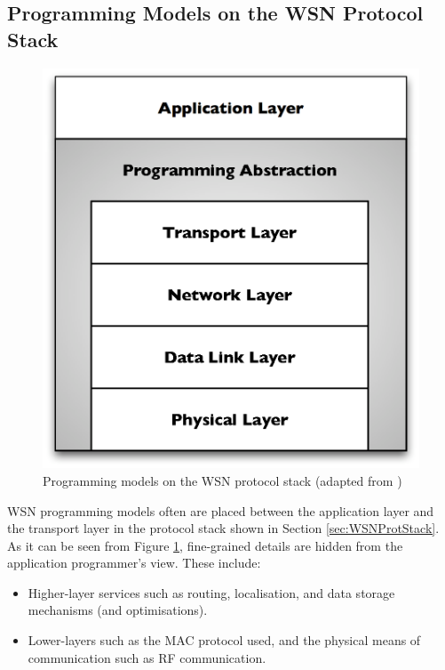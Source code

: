 \subsection{Programming Models on the WSN Protocol Stack}

\begin{figure}
\centering
\includegraphics[scale=0.61]{img/ProtStack_ProgAbstr.eps}
\caption[Programming models on the WSN protocol stack]{Programming models on the WSN protocol
stack (adapted from \cite{mottola_middleware:2008})}
\label{Fig:ProtStack_ProgAbstr}
\end{figure}

WSN programming models often are placed between the application layer and the
transport layer in the protocol stack shown in Section \ref{sec:WSNProtStack}. As it can be seen from
Figure \ref{Fig:ProtStack_ProgAbstr},
fine-grained details are hidden from the application programmer's view. These
include:

\begin{itemize}
  \item Higher-layer services such as routing, localisation, and data storage
  mechanisms (and optimisations).
  \item Lower-layers such as the MAC protocol used, and the physical means of
  communication such as RF communication.
\end{itemize}

